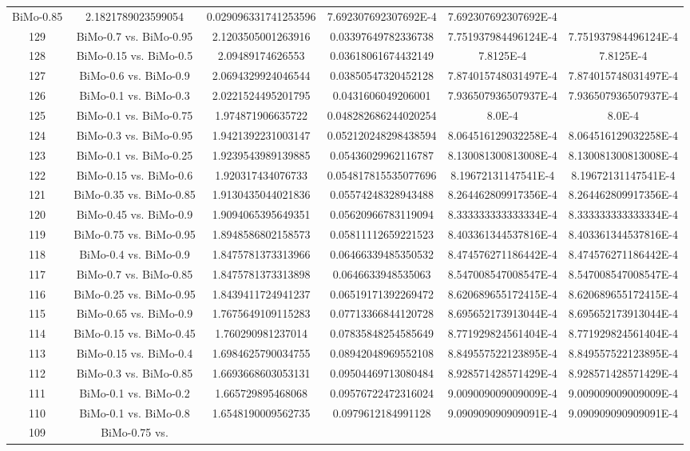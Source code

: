 \documentclass[a4paper,10pt]{article}
\begin{document}
\begin{landscape}
\begin{table}[!htp]
\begin{tabular}{cccccc}
BiMo-0.85&2.1821789023599054&0.029096331741253596&7.692307692307692E-4&7.692307692307692E-4\\129&BiMo-0.7 vs. BiMo-0.95&2.1203505001263916&0.03397649782336738&7.751937984496124E-4&7.751937984496124E-4\\128&BiMo-0.15 vs. BiMo-0.5&2.09489174626553&0.03618061674432149&7.8125E-4&7.8125E-4\\127&BiMo-0.6 vs. BiMo-0.9&2.0694329924046544&0.03850547320452128&7.874015748031497E-4&7.874015748031497E-4\\126&BiMo-0.1 vs. BiMo-0.3&2.0221524495201795&0.0431606049206001&7.936507936507937E-4&7.936507936507937E-4\\125&BiMo-0.1 vs. BiMo-0.75&1.974871906635722&0.048282686244020254&8.0E-4&8.0E-4\\124&BiMo-0.3 vs. BiMo-0.95&1.9421392231003147&0.052120248298438594&8.064516129032258E-4&8.064516129032258E-4\\123&BiMo-0.1 vs. BiMo-0.25&1.9239543989139885&0.05436029962116787&8.130081300813008E-4&8.130081300813008E-4\\122&BiMo-0.15 vs. BiMo-0.6&1.920317434076733&0.054817815535077696&8.19672131147541E-4&8.19672131147541E-4\\121&BiMo-0.35 vs. BiMo-0.85&1.9130435044021836&0.05574248328943488&8.264462809917356E-4&8.264462809917356E-4\\120&BiMo-0.45 vs. BiMo-0.9&1.9094065395649351&0.05620966783119094&8.333333333333334E-4&8.333333333333334E-4\\119&BiMo-0.75 vs. BiMo-0.95&1.8948586802158573&0.05811112659221523&8.403361344537816E-4&8.403361344537816E-4\\118&BiMo-0.4 vs. BiMo-0.9&1.8475781373313966&0.06466339485350532&8.474576271186442E-4&8.474576271186442E-4\\117&BiMo-0.7 vs. BiMo-0.85&1.8475781373313898&0.0646633948535063&8.547008547008547E-4&8.547008547008547E-4\\116&BiMo-0.25 vs. BiMo-0.95&1.8439411724941237&0.06519171392269472&8.620689655172415E-4&8.620689655172415E-4\\115&BiMo-0.65 vs. BiMo-0.9&1.7675649109115283&0.07713366844120728&8.695652173913044E-4&8.695652173913044E-4\\114&BiMo-0.15 vs. BiMo-0.45&1.760290981237014&0.07835848254585649&8.771929824561404E-4&8.771929824561404E-4\\113&BiMo-0.15 vs. BiMo-0.4&1.6984625790034755&0.08942048969552108&8.849557522123895E-4&8.849557522123895E-4\\112&BiMo-0.3 vs. BiMo-0.85&1.6693668603053131&0.09504469713080484&8.928571428571429E-4&8.928571428571429E-4\\111&BiMo-0.1 vs. BiMo-0.2&1.665729895468068&0.09576722472316024&9.009009009009009E-4&9.009009009009009E-4\\110&BiMo-0.1 vs. BiMo-0.8&1.6548190009562735&0.0979612184991128&9.090909090909091E-4&9.090909090909091E-4\\109&BiMo-0.75 vs. 
\end{tabular}
\end{table}
\end{landscape}
\end{document}
